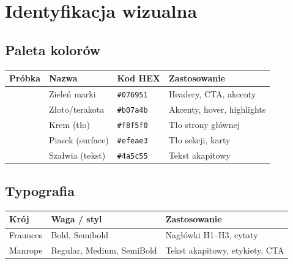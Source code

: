 \documentclass[12pt,a4paper]{article}
\begin{document}
\newpage

\section{Identyfikacja wizualna}

\subsection{Paleta kolorów}

\vspace{0.4cm}
\begin{tabularx}{\textwidth}{@{} p{1.2cm} p{3.5cm} p{3.5cm} X @{}}
  \toprule
  \textbf{Próbka} & \textbf{Nazwa} & \textbf{Kod HEX} & \textbf{Zastosowanie} \\
  \midrule
  \colorbox{swatchA}{\hspace{1cm}\vphantom{X}} & Zieleń marki & \texttt{\#076951} & Headery, CTA, akcenty \\[0.6em]
  \colorbox{swatchB}{\hspace{1cm}\vphantom{X}} & Złoto/terakota & \texttt{\#b07a4b} & Akcenty, hover, highlights \\[0.6em]
  \colorbox{swatchC}{\hspace{1cm}\vphantom{X}} & Krem (tło) & \texttt{\#f8f5f0} & Tło strony głównej \\[0.6em]
  \colorbox{swatchD}{\hspace{1cm}\vphantom{X}} & Piasek (surface) & \texttt{\#efeae3} & Tło sekcji, karty \\[0.6em]
  \colorbox{swatchE}{\hspace{1cm}\vphantom{X}} & Szałwia (tekst) & \texttt{\#4a5c55} & Tekst akapitowy \\
  \bottomrule
\end{tabularx}

\vspace{0.8cm}
\subsection{Typografia}

\begin{tabularx}{\textwidth}{@{} p{3.5cm} p{4cm} X @{}}
  \toprule
  \textbf{Krój} & \textbf{Waga / styl} & \textbf{Zastosowanie} \\
  \midrule
  Fraunces & Bold, Semibold & Nagłówki H1–H3, cytaty \\
  Manrope & Regular, Medium, SemiBold & Tekst akapitowy, etykiety, CTA \\
  \bottomrule
\end{tabularx}
\end{document}
